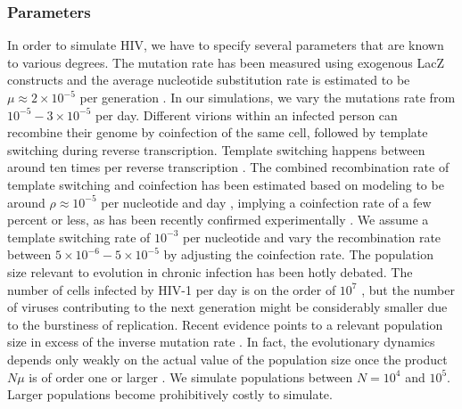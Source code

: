 \documentclass[11pt]{article}
\begin{document}
\subsubsection*{Parameters}
In order to simulate HIV, we have to specify several parameters that are
known to various degrees. The mutation rate has been measured using
exogenous LacZ constructs and the average nucleotide substitution rate is 
estimated to be $\mu\approx 2 \times 10^{-5}$ per generation \citep{mansky_lower_1995,
abram_nature_2010}. In our simulations, we vary the mutations rate
from $10^{-5} - 3\times 10^{-5}$ per day. Different virions within an
infected person can recombine their genome by coinfection of the same
cell, followed by template switching during reverse transcription. 
Template switching happens between around ten times per reverse
transcription \citep{levy_dynamics_2004}. The combined recombination rate of template
switching and coinfection has been estimated based on modeling to be around $\rho\approx
10^{-5}$ per nucleotide and day
\citep{neher_recombination_2010,batorsky_estimate_2011}, implying a
coinfection rate of a few percent or less, as has been recently
confirmed experimentally \citep{josefsson_single_2013}. We assume a
template switching rate of $10^{-3}$ per nucleotide and vary the
recombination rate between $5\times 10^{-6}- 5\times 10^{-5}$ by adjusting the
coinfection rate. The population size relevant to evolution in chronic
infection has been hotly debated. The number of cells infected by HIV-1
per day is on the order of $10^{7}$ \citep{perelson_hiv-1_1996}, but the
number of viruses contributing to the next generation might be
considerably smaller due to the burstiness of replication. 
Recent evidence points to a relevant population
size in excess of the inverse mutation rate
\citep{boltz_ultrasensitive_2012}. In fact, the evolutionary dynamics
depends only weakly on the actual value of the population size once the
product $N\mu$ is of order one or larger \citep{neher_genetic_2011}. We
simulate populations between $N=10^4$ and $10^5$. Larger populations
become prohibitively costly to simulate.
\end{document}
